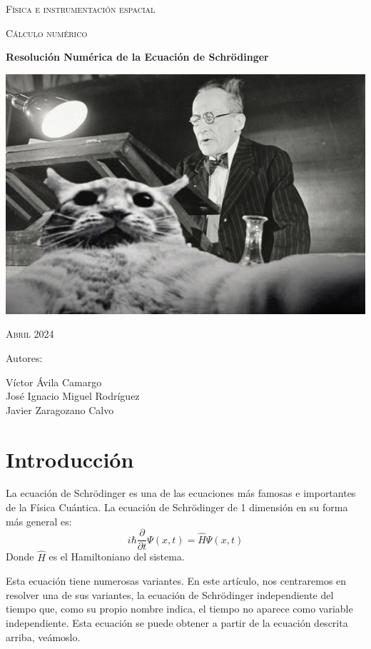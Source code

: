 \documentclass[12pt]{article}
\begin{document}


\begin{titlepage}
\begin{center}
{\scshape\huge Física e instrumentación espacial \par}
\vspace{1cm}
{\scshape\Large Cálculo numérico \par}
\vspace{1cm}
{\textbf{{\Huge Resolución Numérica de la Ecuación de Schrödinger}} \par}
\vspace{1.5cm}
{\includegraphics[scale=0.8]{portada}\par}
\vspace{1cm}
{\scshape\Large Abril 2024 \par}
\vspace{1.5cm}
\end{center}
\begin{flushleft}
{\Large Autores: \par}
{\Large 
Víctor Ávila Camargo\\
José Ignacio Miguel Rodríguez\\
Javier Zaragozano Calvo \par
}
\end{flushleft}
\end{titlepage}

\tableofcontents
\newpage	

\section{Introducción}
La ecuación de Schrödinger es una de las ecuaciones más famosas
e importantes de la Física Cuántica. La ecuación de Schrödinger de 1
dimensión en su forma más general es: 
\begin{equation}
i\hbar \frac{\partial}{\partial t}\Psi (x,t)=\hat{H} \Psi (x,t)
\end{equation}
Donde $\hat{H}$ es el Hamiltoniano del sistema. \\
\par
Esta ecuación tiene numerosas variantes. En este artículo, nos 
centraremos en resolver una de sus variantes, la ecuación de Schrödinger
independiente del tiempo que, como su propio nombre indica, el tiempo
no aparece como variable independiente. Esta ecuación se puede obtener a partir de la ecuación descrita arriba, veámoslo.
\end{document}
